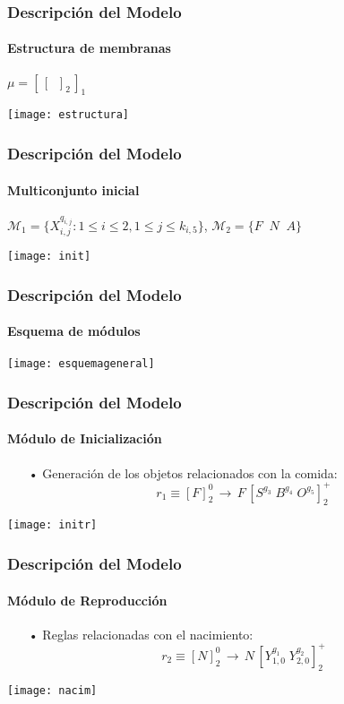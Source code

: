 \documentclass[10pt,a4paper]{beamer}
\theoremstyle{definition}
\theoremstyle{remark}
\begin{document}
\begin{frame}
\frametitle{Descripción del Modelo}
\framesubtitle{Estructura de membranas}
\begin{center}
$\mu=[\,[\;\;]_{2}\,]_{1}$

\texttt{[image: estructura]}
\end{center}

\end{frame}

\begin{frame}
\frametitle{Descripción del Modelo}
\framesubtitle{Multiconjunto inicial}
\begin{center}
$\mathcal{M}_1=\{X^{q_{i,j}}_{i,j} : 1\leq i \leq 2, 1 \leq j \leq k_{i,5}\}$, $\mathcal{M}_2=\{F \;\; N \;\; A\}$

\texttt{[image: init]}
\end{center}
\end{frame}

\begin{frame}
\frametitle{Descripción del Modelo}
\framesubtitle{Esquema de módulos}
\begin{center}
\texttt{[image: esquemageneral]}
\end{center}
\end{frame}

\begin{frame}
\frametitle{Descripción del Modelo}
\framesubtitle{Módulo de Inicialización}
\begin{center}
\begin{small}
\begin{itemize}
\item[•] Generación de los objetos relacionados con la comida:
$$r_1 \equiv [F]^0_2 \,\longrightarrow \,F \, [S^{g_3}\;B^{g_4}\;O^{g_5}]^+_2 $$
\end{itemize}
\end{small}
\texttt{[image: initr]}
\end{center}
\end{frame}

\begin{frame}
\frametitle{Descripción del Modelo}
\framesubtitle{Módulo de Reproducción}
\begin{small}
\begin{itemize}
\item[•] Reglas relacionadas con el nacimiento:
$$r_2 \equiv [N]^0_2 \,\longrightarrow \,N \, [Y^{g_1}_{1,0}\;Y^{g_2}_{2,0}]^+_2$$
\end{itemize}
\end{small}
\begin{center}
\texttt{[image: nacim]}
\end{center}
\end{frame}
\end{document}
